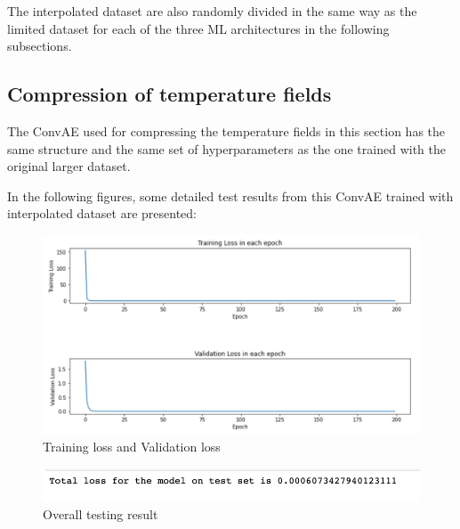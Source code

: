 The interpolated dataset are also randomly divided in the same way as the limited dataset for each of the three ML architectures in the following subsections.


\subsection{Compression of temperature fields}

The ConvAE used for compressing the temperature fields in this section has the same structure and the same set of hyperparameters as the one trained with the original larger dataset.

In the following figures, some detailed test results from this ConvAE trained with interpolated dataset are presented:

\begin{figure}[H]
    \caption{Training loss and Validation loss}
    \includegraphics[scale=0.6]{Report LaTeX/figures/mantle_convection_images/larger_dataset_interpolated/ConvAE_trainingData.png}
\end{figure}

\begin{figure}[H]
    \caption{Overall testing result}
    \includegraphics[scale=0.8]{Report LaTeX/figures/mantle_convection_images/larger_dataset_interpolated/ConvAE_OverallTesting.png}
\end{figure}

